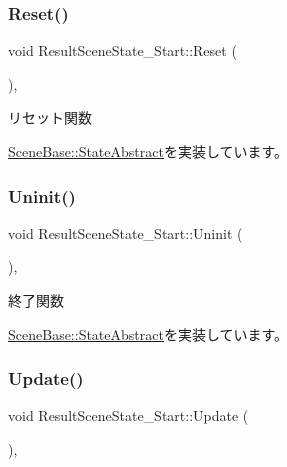 \subsubsection{\texorpdfstring{Reset()}{Reset()}}
{\footnotesize\ttfamily void Result\+Scene\+State\+\_\+\+Start\+::\+Reset (\begin{DoxyParamCaption}{ }\end{DoxyParamCaption})\hspace{0.3cm}{\ttfamily [override]}, {\ttfamily [virtual]}}



リセット関数 



\mbox{\hyperlink{class_scene_base_1_1_state_abstract_a7e00d36fa023d91a0f205f12662584a0}{Scene\+Base\+::\+State\+Abstract}}を実装しています。

\mbox{\label{class_result_scene_state___start_af5b9af607074e3296481a1660607fb9a}} 
\subsubsection{\texorpdfstring{Uninit()}{Uninit()}}
{\footnotesize\ttfamily void Result\+Scene\+State\+\_\+\+Start\+::\+Uninit (\begin{DoxyParamCaption}{ }\end{DoxyParamCaption})\hspace{0.3cm}{\ttfamily [override]}, {\ttfamily [virtual]}}



終了関数 



\mbox{\hyperlink{class_scene_base_1_1_state_abstract_a7a92fbd3fd68177a4e807bf7c359641c}{Scene\+Base\+::\+State\+Abstract}}を実装しています。

\mbox{\label{class_result_scene_state___start_a2ecdef2bef0cd1a04055e8687e11199b}} 
\subsubsection{\texorpdfstring{Update()}{Update()}}
{\footnotesize\ttfamily void Result\+Scene\+State\+\_\+\+Start\+::\+Update (\begin{DoxyParamCaption}{ }\end{DoxyParamCaption})\hspace{0.3cm}{\ttfamily [override]}, {\ttfamily [virtual]}}



